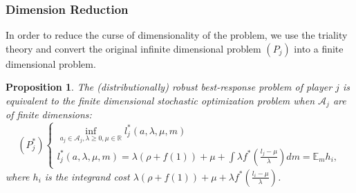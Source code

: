 \documentclass{article}
\newtheorem{proposition}{Proposition}
\begin{document}
\subsubsection{Dimension Reduction}
\label{sec:dimReduct}
In order to reduce the curse of dimensionality of the problem, we use the triality theory and convert the original infinite dimensional problem $(P_j)$ into a finite dimensional problem.
\begin{proposition}
The (distributionally) robust best-response problem of player $j$ is equivalent to the finite dimensional stochastic optimization problem when $\mathcal{A}_j$ are of finite dimensions:
\begin{equation}\label{eq:finite} ({P}^*_j)\left\{
\begin{array}{l}
\inf_{a_j\in \mathcal{A}_j,\lambda\geq 0,\mu\in \mathbb{R}}l_j^*(a,\lambda,\mu,m) \\
l_j^*(a,\lambda,\mu,m) = \lambda(\rho+f(1))+\mu +\int \lambda f^*(\frac{ {l}_j-\mu}{\lambda}) dm = \mathbb{E}_{m} h_i,
\end{array} \right.
\end{equation}
where $h_i$ is the integrand cost $\lambda(\rho+f(1))+\mu + \lambda f^*(\frac{ {l}_i-\mu}{\lambda})$.
\end{proposition}
\end{document}
